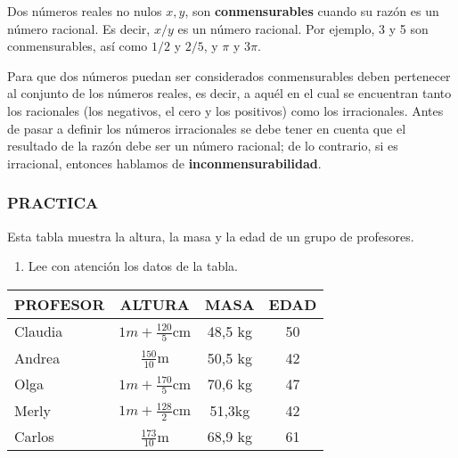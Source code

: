 \documentclass[12pt,a4paper]{article}
\begin{document}
\begin{tcolorbox}[colback=fondoazul,colframe=azuloscuro,title=\textbf{RECUERDA QUE...},fonttitle=\bfseries]

Dos números reales no nulos $x, y$, son \textbf{conmensurables} cuando su razón es un número racional. Es decir, $x/y$ es un número racional. Por ejemplo, 3 y 5 son conmensurables, así como $1/2$ y $2/5$, y $\pi$ y $3\pi$.

Para que dos números puedan ser considerados conmensurables deben pertenecer al conjunto de los números reales, es decir, a aquél en el cual se encuentran tanto los racionales (los negativos, el cero y los positivos) como los irracionales. Antes de pasar a definir los números irracionales se debe tener en cuenta que el resultado de la razón debe ser un número racional; de lo contrario, si es irracional, entonces hablamos de \textbf{inconmensurabilidad}.

\end{tcolorbox}

\vspace{0.5cm}

\subsubsection*{PRACTICA}

Esta tabla muestra la altura, la masa y la edad de un grupo de profesores.

\begin{enumerate}
\item Lee con atención los datos de la tabla.
\end{enumerate}


\begin{center}
\renewcommand{\arraystretch}{1.8}
\setlength{\extrarowheight}{4pt}
\begin{tabular}{|l|c|c|c|}
\hline
\textbf{PROFESOR} & \textbf{ALTURA} & \textbf{MASA} & \textbf{EDAD} \\
\hline
Claudia & $1m + \frac{120}{5}$cm & 48,5 kg & 50 \\
\hline
Andrea & $\frac{150}{10}$m & 50,5 kg & 42 \\
\hline
Olga & $1m + \frac{170}{5}$cm & 70,6 kg & 47 \\
\hline
Merly & $1m + \frac{128}{2}$cm & 51,3kg & 42 \\
\hline
Carlos & $\frac{173}{10}$m & 68,9 kg & 61 \\
\hline
\end{tabular}
\renewcommand{\arraystretch}{1}
\setlength{\extrarowheight}{0pt}
\end{center}
\end{document}
